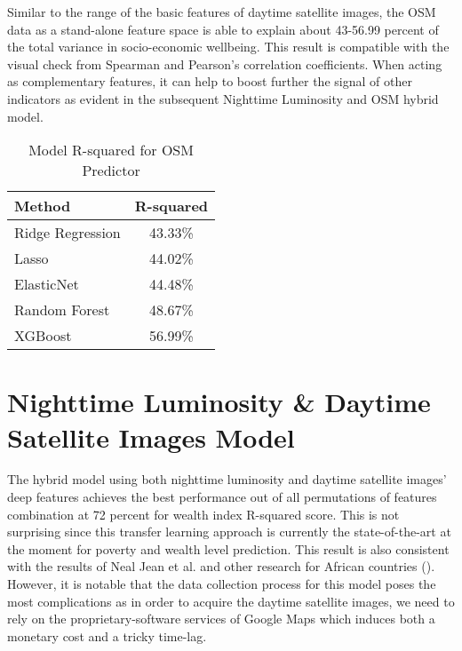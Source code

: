 \documentclass[solid,math,chem,code,plot,gloss]{bmc}
\begin{document}
Similar to the range of the basic features of daytime satellite images, the OSM data as a stand-alone feature space is able to explain about 43-56.99 percent of the total variance in socio-economic wellbeing. This result is compatible with the visual check from Spearman and Pearson's correlation coefficients. When acting as complementary features, it can help to boost further the signal of other indicators as evident in the subsequent Nighttime Luminosity and OSM hybrid model. 

\begin{table}[hbt!]
\begin{center}
\begin{tabular}{|l|c|}
\hline
Method & R-squared \\
\hline\hline\hline
Ridge Regression & 43.33\% \\
Lasso & 44.02\% \\
ElasticNet & 44.48\% \\
Random Forest & 48.67\% \\
XGBoost & 56.99\% \\

\hline
\end{tabular}
\end{center}
\label{tab:RMSEs}
\caption{Model R-squared for OSM Predictor}
\end{table}

\section{Nighttime Luminosity \& Daytime Satellite Images Model}

The hybrid model using both nighttime luminosity and daytime satellite images' deep features achieves the best performance out of all permutations of features combination at 72 percent for wealth index R-squared score. This is not surprising since this transfer learning approach is currently the state-of-the-art at the moment for poverty and wealth level prediction. This result is also consistent with the results of Neal Jean et al. and other research for African countries (\cite{Neal_2016}). However, it is notable that the data collection process for this model poses the most complications as in order to acquire the daytime satellite images, we need to rely on the proprietary-software services of Google Maps which induces both a monetary cost and a tricky time-lag. 
\end{document}
